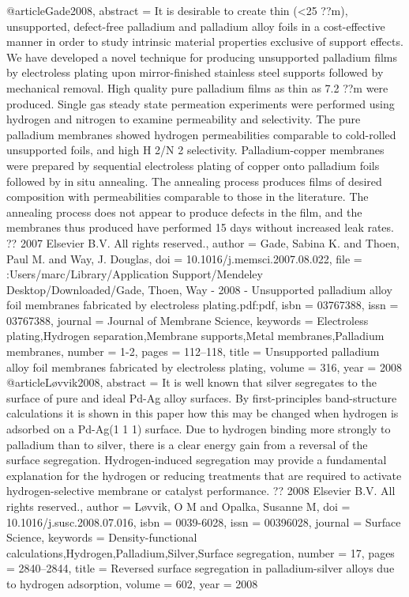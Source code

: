 @article{Gade2008,
abstract = {It is desirable to create thin ({\textless}25 ??m), unsupported, defect-free palladium and palladium alloy foils in a cost-effective manner in order to study intrinsic material properties exclusive of support effects. We have developed a novel technique for producing unsupported palladium films by electroless plating upon mirror-finished stainless steel supports followed by mechanical removal. High quality pure palladium films as thin as 7.2 ??m were produced. Single gas steady state permeation experiments were performed using hydrogen and nitrogen to examine permeability and selectivity. The pure palladium membranes showed hydrogen permeabilities comparable to cold-rolled unsupported foils, and high H
                        2/N
                        2 selectivity. Palladium-copper membranes were prepared by sequential electroless plating of copper onto palladium foils followed by in situ annealing. The annealing process produces films of desired composition with permeabilities comparable to those in the literature. The annealing process does not appear to produce defects in the film, and the membranes thus produced have performed 15 days without increased leak rates. ?? 2007 Elsevier B.V. All rights reserved.},
author = {Gade, Sabina K. and Thoen, Paul M. and Way, J. Douglas},
doi = {10.1016/j.memsci.2007.08.022},
file = {:Users/marc/Library/Application Support/Mendeley Desktop/Downloaded/Gade, Thoen, Way - 2008 - Unsupported palladium alloy foil membranes fabricated by electroless plating.pdf:pdf},
isbn = {03767388},
issn = {03767388},
journal = {Journal of Membrane Science},
keywords = {Electroless plating,Hydrogen separation,Membrane supports,Metal membranes,Palladium membranes},
number = {1-2},
pages = {112--118},
title = {{Unsupported palladium alloy foil membranes fabricated by electroless plating}},
volume = {316},
year = {2008}
}
@article{Løvvik2008,
abstract = {It is well known that silver segregates to the surface of pure and ideal Pd-Ag alloy surfaces. By first-principles band-structure calculations it is shown in this paper how this may be changed when hydrogen is adsorbed on a Pd-Ag(1 1 1) surface. Due to hydrogen binding more strongly to palladium than to silver, there is a clear energy gain from a reversal of the surface segregation. Hydrogen-induced segregation may provide a fundamental explanation for the hydrogen or reducing treatments that are required to activate hydrogen-selective membrane or catalyst performance. ?? 2008 Elsevier B.V. All rights reserved.},
author = {L{\o}vvik, O M and Opalka, Susanne M},
doi = {10.1016/j.susc.2008.07.016},
isbn = {0039-6028},
issn = {00396028},
journal = {Surface Science},
keywords = {Density-functional calculations,Hydrogen,Palladium,Silver,Surface segregation},
number = {17},
pages = {2840--2844},
title = {{Reversed surface segregation in palladium-silver alloys due to hydrogen adsorption}},
volume = {602},
year = {2008}
}
